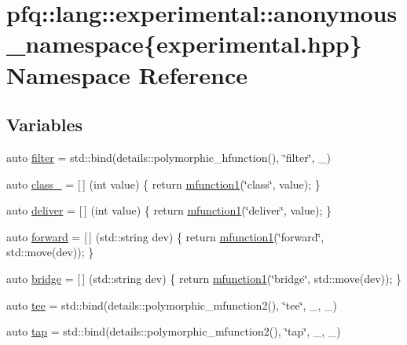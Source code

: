 \hypertarget{namespacepfq_1_1lang_1_1experimental_1_1anonymous__namespace_02experimental_8hpp_03}{\section{pfq\+:\+:lang\+:\+:experimental\+:\+:anonymous\+\_\+namespace\{experimental.\+hpp\} Namespace Reference}
\label{namespacepfq_1_1lang_1_1experimental_1_1anonymous__namespace_02experimental_8hpp_03}
}
\subsection*{Variables}
\begin{DoxyCompactItemize}
\item 
auto \hyperlink{namespacepfq_1_1lang_1_1experimental_1_1anonymous__namespace_02experimental_8hpp_03_ae9cec76098e666e9b129804f44a93ae1}{filter} = std\+::bind(details\+::polymorphic\+\_\+hfunction(), \char`\"{}filter\char`\"{}, \+\_)
\item 
auto \hyperlink{namespacepfq_1_1lang_1_1experimental_1_1anonymous__namespace_02experimental_8hpp_03_a55ce0b220b42a47460d1d40d3d5fdd5d}{class\+\_\+} = \mbox{[}$\,$\mbox{]} (int value) \{ return \hyperlink{namespacepfq_1_1lang_a68d775c68562fbd0ab9ef213f2519499}{mfunction1}(\char`\"{}class\char`\"{}, value); \}
\item 
auto \hyperlink{namespacepfq_1_1lang_1_1experimental_1_1anonymous__namespace_02experimental_8hpp_03_aabd600ebf1ee62184fa0765f49f9f990}{deliver} = \mbox{[}$\,$\mbox{]} (int value) \{ return \hyperlink{namespacepfq_1_1lang_a68d775c68562fbd0ab9ef213f2519499}{mfunction1}(\char`\"{}deliver\char`\"{}, value); \}
\item 
auto \hyperlink{namespacepfq_1_1lang_1_1experimental_1_1anonymous__namespace_02experimental_8hpp_03_a52cf166afea2ff74bffc6efbf839af0a}{forward} = \mbox{[}$\,$\mbox{]} (std\+::string dev) \{ return \hyperlink{namespacepfq_1_1lang_a68d775c68562fbd0ab9ef213f2519499}{mfunction1}(\char`\"{}forward\char`\"{}, std\+::move(dev)); \}
\item 
auto \hyperlink{namespacepfq_1_1lang_1_1experimental_1_1anonymous__namespace_02experimental_8hpp_03_a03fc8960a5fbbe59f000bd9c5a74b7fe}{bridge} = \mbox{[}$\,$\mbox{]} (std\+::string dev) \{ return \hyperlink{namespacepfq_1_1lang_a68d775c68562fbd0ab9ef213f2519499}{mfunction1}(\char`\"{}bridge\char`\"{}, std\+::move(dev)); \}
\item 
auto \hyperlink{namespacepfq_1_1lang_1_1experimental_1_1anonymous__namespace_02experimental_8hpp_03_a1c49a70b83c2e42067c558a8bfcf8211}{tee} = std\+::bind(details\+::polymorphic\+\_\+mfunction2(), \char`\"{}tee\char`\"{}, \+\_, \+\_)
\item 
auto \hyperlink{namespacepfq_1_1lang_1_1experimental_1_1anonymous__namespace_02experimental_8hpp_03_a66641cfa5d43270458e7fbfb626d0e2e}{tap} = std\+::bind(details\+::polymorphic\+\_\+mfunction2(), \char`\"{}tap\char`\"{}, \+\_, \+\_)
\end{DoxyCompactItemize}


